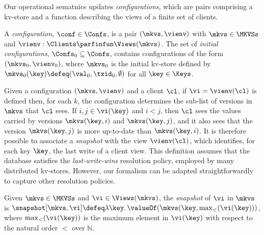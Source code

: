 Our operational sematnics updates {\em configurations},  which are pairs
comprising a kv-store and a function describing the
views of a finite set of clients. 

\begin{definition}
A \emph{configuration}, $\conf \in \Confs $,  is a pair $ (\mkvs, \vienv)$
with $\mkvs \in \MKVSs$ and
$\vienv : \Clients \parfinfun \Views(\mkvs)$. 
The set of \emph{initial configurations}, $\Confs_0 \subseteq \Confs$,
contains configurations of the form $ (\mkvs_0, \vienv_0)$, where
$\mkvs_0$ is the { initial kv-store}
defined by
$\mkvs_{0}(\key)\defeq  (\val_0, \txid_0, \emptyset)$ for
all $\key \in \Keys$. 
\end{definition}


Given a configuration $(\mkvs, \vienv)$ and a client $\cl$, 
if $\vi = \vienv(\cl)$ is defined then, for each $k$,  the
configuration determines the sub-list of versions in $\mkvs$ that $\cl$ sees.
If $i,j \in \vi(\key)$ and $i < j$, then $\cl$ sees the values 
carried by versions $\mkvs(\key, i)$ and  $\mkvs(\key, j)$, 
and it also sees that the version 
$\mkvs(\key, j)$ is more 
up-to-date than $\mkvs(\key, i)$. 
It is therefore possible to associate a \emph{snapshot}
with 
the view $\vienv(\cl)$, 
which identifies, for each key $\key$, the last write of a client view. 
This definition assumes that the database satisfies the \emph{last-write-wins}
resolution policy, employed by many distributed kv-stores.
However, our formalism can be adapted straightforwardly  to capture other resolution policies. 

\begin{definition}[Snapshots]
\label{def:snapshot}
Given $\mkvs \in \MKVSs$ and $\vi \in \Views(\mkvs)$, the \emph{snapshot} of $\vi$ in 
$\mkvs$ is $\snapshot[\mkvs, \vi] \defeq \lambda \key \ldotp \valueOf(\mkvs(\key, \max_{<}(\vi(\key)))$, 
where $\max_{<}(\vi(\key))$ is the maximum element in $\vi(\key)$ with respect to the natural 
order $<$ over $\mathbb{N}$.
\end{definition}

